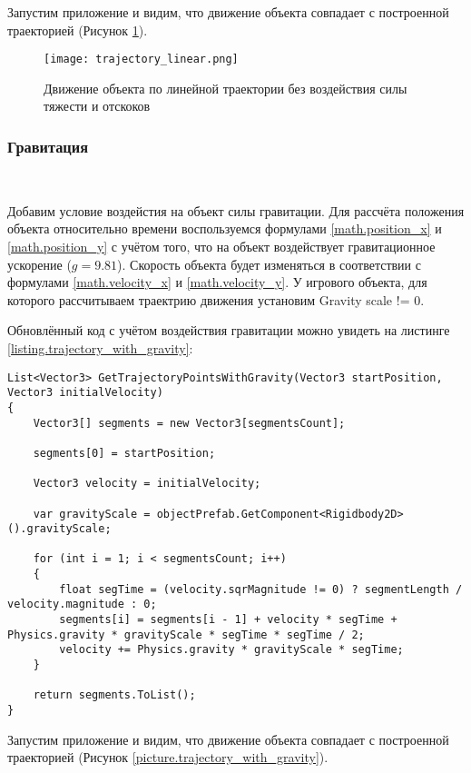 Запустим приложение и видим, что движение объекта совпадает с построенной траекторией (Рисунок \ref{picture.trajectory_linear}).

\begin{figure}[h]
	\noindent\centering
	\texttt{[image: trajectory\_linear.png]}  
	\caption{Движение объекта по линейной траектории без воздействия силы тяжести и отскоков}
	\label{picture.trajectory_linear}
\end{figure}

\subsubsection{Гравитация}~

Добавим условие воздейстия на объект силы гравитации. Для рассчёта положения объекта относительно времени воспользуемся формулами \ref{math.position_x} и \ref{math.position_y} с учётом того, что на объект воздействует гравитационное ускорение ($g = 9.81$). Скорость объекта будет изменяться в соответствии с формулами \ref{math.velocity_x} и \ref{math.velocity_y}. У игрового объекта, для которого рассчитываем траектрию движения установим Gravity scale != 0.

Обновлённый код с учётом воздействия гравитации можно увидеть на листинге \ref{listing.trajectory_with_gravity}:

\begin{lstlisting}[style=fsharpstyle, caption={Построение траектории движущегося объекта c учётом гравитации}, label=listing.trajectory_with_gravity]
List<Vector3> GetTrajectoryPointsWithGravity(Vector3 startPosition, Vector3 initialVelocity)
{
	Vector3[] segments = new Vector3[segmentsCount];
	
	segments[0] = startPosition;
	
	Vector3 velocity = initialVelocity;
	
	var gravityScale = objectPrefab.GetComponent<Rigidbody2D>().gravityScale;
	
	for (int i = 1; i < segmentsCount; i++)
	{
		float segTime = (velocity.sqrMagnitude != 0) ? segmentLength / velocity.magnitude : 0;
		segments[i] = segments[i - 1] + velocity * segTime + Physics.gravity * gravityScale * segTime * segTime / 2;
		velocity += Physics.gravity * gravityScale * segTime;
	}
	
	return segments.ToList();
}
\end{lstlisting}

Запустим приложение и видим, что движение объекта совпадает с построенной траекторией (Рисунок \ref{picture.trajectory_with_gravity}).

